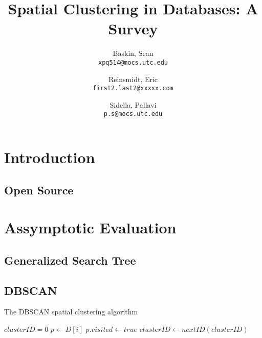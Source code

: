 \documentclass{article}
\author{
  Baskin, Sean\\
  \texttt{xpq514@mocs.utc.edu}
  \and
  Reinsmidt, Eric\\
  \texttt{first2.last2@xxxxx.com}
  \and
  Sidella, Pallavi\\
  \texttt{p.s@mocs.utc.edu}
}
\title{Spatial Clustering in Databases: A Survey}
\begin{document}
\maketitle

\section{Introduction}

\subsection{Open Source}

\section{Assymptotic Evaluation}

\subsection{Generalized Search Tree}

\subsection{DBSCAN}

\begin{algorithm}
\caption{The DBSCAN spatial clustering algorithm}
\begin{algorithmic}[1]
	\State $clusterID = 0$
      \State $p \gets D[i]$
      \State $p.visited \gets true$    
          \State $clusterID \gets nextID(clusterID)$
        \EndIf
      \EndIf
	\EndFor
\EndProcedure
\Statex
{}
\EndProcedure
\end{algorithmic}
\end{algorithm}
\end{document}
